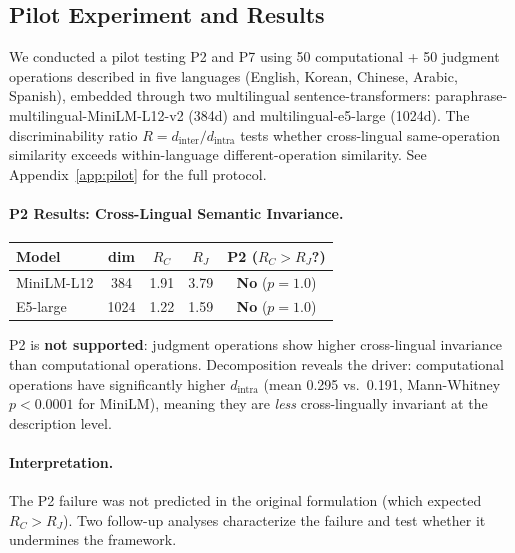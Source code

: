 \documentclass[11pt]{article}
\theoremstyle{definition}
\begin{document}
\subsection{Pilot Experiment and Results}\label{sec:pilot}

We conducted a pilot testing P2 and P7 using 50 computational + 50 judgment operations described in five languages (English, Korean, Chinese, Arabic, Spanish), embedded through two multilingual sentence-transformers: paraphrase-multilingual-MiniLM-L12-v2 (384d) and multilingual-e5-large (1024d). The discriminability ratio $R = d_{\text{inter}}/d_{\text{intra}}$ tests whether cross-lingual same-operation similarity exceeds within-language different-operation similarity. See Appendix~\ref{app:pilot} for the full protocol.

\paragraph{P2 Results: Cross-Lingual Semantic Invariance.}

\begin{table}[h]
\centering
\small
\begin{tabular}{lcccc}
\toprule
\textbf{Model} & \textbf{dim} & $R_C$ & $R_J$ & \textbf{P2} ($R_C > R_J$?) \\
\midrule
MiniLM-L12 & 384 & 1.91 & 3.79 & \textbf{No} ($p=1.0$) \\
E5-large & 1024 & 1.22 & 1.59 & \textbf{No} ($p=1.0$) \\
\bottomrule
\end{tabular}
\end{table}

P2 is \textbf{not supported}: judgment operations show higher cross-lingual invariance than computational operations. Decomposition reveals the driver: computational operations have significantly higher $d_{\text{intra}}$ (mean 0.295 vs.\ 0.191, Mann-Whitney $p < 0.0001$ for MiniLM), meaning they are \emph{less} cross-lingually invariant at the description level.

\paragraph{Interpretation.}
The P2 failure was not predicted in the original formulation (which expected $R_C > R_J$). Two follow-up analyses characterize the failure and test whether it undermines the framework.
\end{document}
